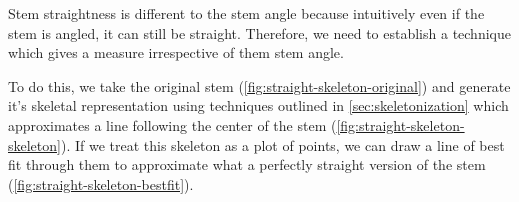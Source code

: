 Stem straightness is different to the stem angle because intuitively even if the stem is angled, it can still be straight. Therefore, we need to establish a technique which gives a measure irrespective of them stem angle.

To do this, we take the original stem (\cref{fig:straight-skeleton-original}) and generate it's skeletal representation using techniques outlined in \cref{sec:skeletonization} which approximates a line following the center of the stem (\cref{fig:straight-skeleton-skeleton}). If we treat this skeleton as a plot of points, we can draw a line of best fit through them to approximate what a perfectly straight version of the stem (\cref{fig:straight-skeleton-bestfit}).

\begin{figure}[h!]
    \centering


\end{figure}

